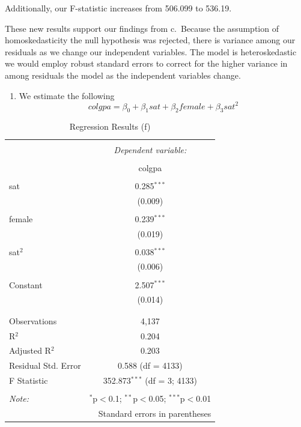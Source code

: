\documentclass[
  12pt,
  landscape]{article}
\providecommand{\tightlist}{%
  \setlength{\itemsep}{0pt}\setlength{\parskip}{0pt}}
\begin{document}
Additionally, our F-statistic increases from 506.099 to 536.19.

These new results support our findings from c.~Because the assumption of
homoskedasticity the null hypothesis was rejected, there is variance
among our residuals as we change our independent variables. The model is
heteroskedastic we would employ robust standard errors to correct for
the higher variance in among residuals the model as the independent
variables change.

\begin{enumerate}
\def\labelenumi{(\alph{enumi})}
\setcounter{enumi}{5}
\tightlist
\item
  We estimate the following \[
  colgpa = \beta_0 + \beta_1sat + \beta_2female + \beta_3sat^2
  \]
\end{enumerate}

\begin{table}[H] \centering 
  \caption{Regression Results (f)} 
  \label{} 
\begin{tabular}{@{\extracolsep{5pt}}lc} 
\\[-1.8ex]\hline 
\hline \\[-1.8ex] 
 & \multicolumn{1}{c}{\textit{Dependent variable:}} \\ 
\cline{2-2} 
\\[-1.8ex] & colgpa \\ 
\hline \\[-1.8ex] 
 sat & 0.285$^{***}$ \\ 
  & (0.009) \\ 
  & \\ 
 female & 0.239$^{***}$ \\ 
  & (0.019) \\ 
  & \\ 
 sat$^{2}$ & 0.038$^{***}$ \\ 
  & (0.006) \\ 
  & \\ 
 Constant & 2.507$^{***}$ \\ 
  & (0.014) \\ 
  & \\ 
\hline \\[-1.8ex] 
Observations & 4,137 \\ 
R$^{2}$ & 0.204 \\ 
Adjusted R$^{2}$ & 0.203 \\ 
Residual Std. Error & 0.588 (df = 4133) \\ 
F Statistic & 352.873$^{***}$ (df = 3; 4133) \\ 
\hline 
\hline \\[-1.8ex] 
\textit{Note:}  & \multicolumn{1}{r}{$^{*}$p$<$0.1; $^{**}$p$<$0.05; $^{***}$p$<$0.01} \\ 
 & \multicolumn{1}{r}{Standard errors in parentheses} \\ 
\end{tabular} 
\end{table}
\end{document}
